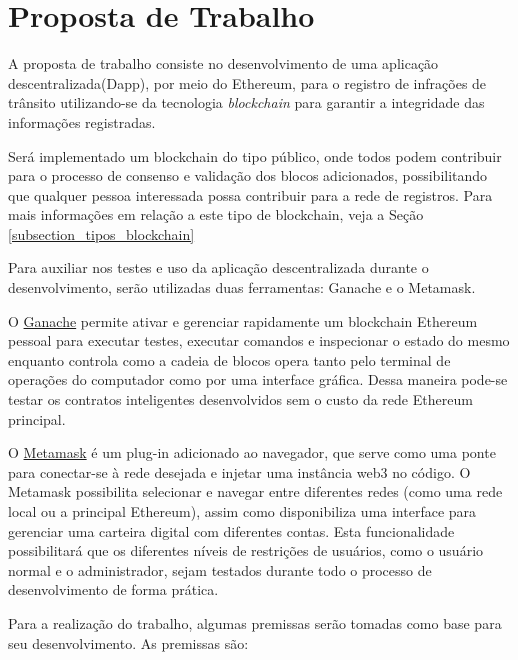 \chapter[Proposta de Trabalho]{Proposta de Trabalho}


A proposta de trabalho consiste no desenvolvimento de uma aplicação descentralizada(Dapp), por meio do Ethereum, para o registro de infrações de trânsito utilizando-se da tecnologia \textit{blockchain} para garantir a integridade das informações registradas. 

Será implementado um blockchain do tipo público, onde todos podem contribuir para o processo de consenso e validação dos blocos adicionados, possibilitando que qualquer pessoa interessada possa contribuir para a rede de registros. Para mais informações em relação a este tipo de blockchain, veja a Seção \ref{subsection_tipos_blockchain}

Para auxiliar nos testes e uso da aplicação descentralizada durante o desenvolvimento, serão utilizadas duas ferramentas: Ganache e o Metamask. 

O \href{https://www.trufflesuite.com/docs/ganache/quickstart}{Ganache} permite ativar e gerenciar rapidamente um blockchain Ethereum pessoal para executar testes, executar comandos e inspecionar o estado do mesmo enquanto controla como a cadeia de blocos opera tanto pelo terminal de operações do computador como por uma interface gráfica. Dessa maneira pode-se testar os contratos inteligentes desenvolvidos sem o custo da rede Ethereum principal. 

O \href{https://metamask.io/}{Metamask} é um plug-in adicionado ao navegador, que serve como uma ponte para conectar-se à rede desejada e injetar uma instância web3 no código. O Metamask possibilita selecionar e navegar entre diferentes redes (como uma rede local ou a principal Ethereum), assim como disponibiliza uma interface para gerenciar uma carteira digital com diferentes contas. Esta funcionalidade possibilitará que os diferentes níveis de restrições de usuários, como o usuário normal e o administrador, sejam testados durante todo o processo de desenvolvimento de forma prática.




Para a realização do trabalho, algumas premissas serão tomadas como base para seu desenvolvimento. As premissas são:

